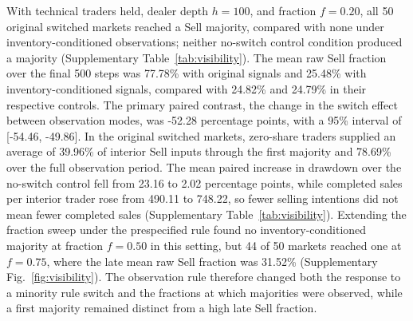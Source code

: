 With technical traders held, dealer depth $h=100$, and
fraction $f=0.20$, all 50 original switched markets reached a Sell
majority, compared with none under inventory-conditioned observations;
neither no-switch control condition produced a majority (Supplementary
Table~\ref{tab:visibility}). The mean raw Sell fraction over the final
500 steps was 77.78\% with original signals
and 25.48\% with inventory-conditioned
signals, compared with 24.82\% and
24.79\% in their respective controls.
The primary paired contrast, the change in the switch effect between
observation modes, was -52.28 percentage points,
with a 95\% interval of [-54.46, -49.86].
In the original switched markets, zero-share traders supplied an
average of 39.96\% of interior Sell
inputs through the first majority and
78.69\% over the full observation
period. The mean paired increase in drawdown over the no-switch control
fell from 23.16 to
2.02 percentage points, while completed
sales per interior trader rose from
490.11 to
748.22, so fewer selling intentions
did not mean fewer completed sales (Supplementary
Table~\ref{tab:visibility}). Extending the fraction sweep under the
prespecified rule found no inventory-conditioned majority at fraction
$f=0.50$ in this setting, but 44 of 50 markets
reached one at $f=0.75$, where the late mean raw Sell fraction was
31.52\% (Supplementary
Fig.~\ref{fig:visibility}). The observation rule therefore changed
both the response to a minority rule switch and the fractions at which
majorities were observed, while a first majority remained distinct from
a high late Sell fraction.
